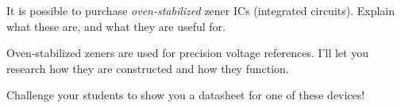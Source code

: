 

It is possible to purchase {\it oven-stabilized} zener ICs (integrated circuits).  Explain what these are, and what they are useful for.







Oven-stabilized zeners are used for precision voltage references.  I'll let you research how they are constructed and how they function.







Challenge your students to show you a datasheet for one of these devices!




